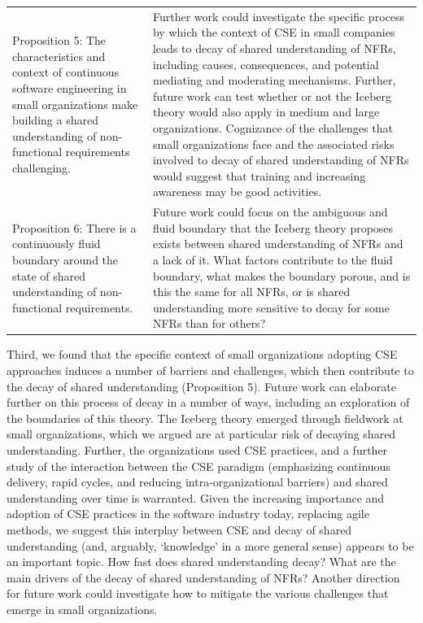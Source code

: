 \documentclass[smallextended]{svjour3}       %
\begin{document}
\begin{table}[!h]
\begin{tabular}{p{4cm}p{7cm}}
\addlinespace 

Proposition 5: The characteristics and context of continuous software engineering in small organizations make building a shared understanding of non-functional requirements challenging. 
& 
Further work could investigate the specific process by which the context of CSE in small companies leads to decay of shared understanding of NFRs, including causes, consequences, and potential mediating and moderating mechanisms. Further, future work can test whether or not the Iceberg theory would also apply in medium and large organizations. Cognizance of the challenges that small organizations face and the associated risks involved to decay of shared understanding of NFRs would suggest that training and increasing awareness may be good activities.
\\

\addlinespace 

Proposition 6: There is a continuously fluid boundary around the state of
shared understanding of non-functional requirements.
& 
Future work could focus on the ambiguous and fluid boundary that the Iceberg theory proposes exists between shared understanding of NFRs and a lack of it. What factors contribute to the fluid boundary, what makes the boundary porous, and is this the same for all NFRs, or is shared understanding more sensitive to decay for some NFRs than for others? \\

\bottomrule 
         
\end{tabular}
    
\end{table}


Third, we found that the specific context of small organizations adopting CSE approaches induces a number of barriers and challenges, which then contribute to the decay of shared understanding (Proposition 5). Future work can elaborate further on this process of decay in a number of ways, including an exploration of the boundaries of this theory. The Iceberg theory emerged through fieldwork at small organizations, which we argued are at particular risk of decaying shared understanding. Further, the organizations used CSE practices, and a further study of the interaction between the CSE paradigm (emphasizing continuous delivery, rapid cycles, and reducing intra-organizational barriers) and shared understanding over time is warranted. Given the increasing importance and adoption of CSE practices in the software industry today, replacing agile methods, we suggest this interplay between CSE and 
decay of shared understanding (and, arguably, `knowledge' in a more general sense) appears to be an important topic.
How fast does shared understanding decay? What are the main drivers of the decay of shared understanding of NFRs?
Another direction for future work could investigate how to mitigate the various challenges that emerge in small organizations. 
\end{document}
